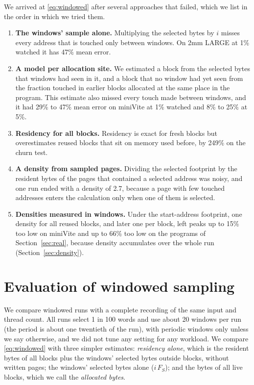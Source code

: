 \documentclass[11pt]{article}
\newcommand{\secref}[1]{Section~\ref{#1}}
\newcommand{\term}[1]{\emph{#1}}
\begin{document}
We arrived at \eqref{eq:windowed} after several approaches that failed, which we list in the order in which we tried them.
\begin{enumerate}
\item \textbf{The windows' sample alone.} Multiplying the selected bytes by $i$ misses every address that is touched only between windows. On 2mm LARGE at 1\% watched it has 47\% mean error.
\item \textbf{A model per allocation site.} We estimated a block from the selected bytes that windows had seen in it, and a block that no window had yet seen from the fraction touched in earlier blocks allocated at the same place in the program. This estimate also missed every touch made between windows, and it had 29\% to 47\% mean error on miniVite at 1\% watched and 8\% to 25\% at 5\%.
\item \textbf{Residency for all blocks.} Residency is exact for fresh blocks but overestimates reused blocks that sit on memory used before, by 249\% on the churn test.
\item \textbf{A density from sampled pages.} Dividing the selected footprint by the resident bytes of the pages that contained a selected address was noisy, and one run ended with a density of 2.7, because a page with few touched addresses enters the calculation only when one of them is selected.
\item \textbf{Densities measured in windows.} Under the start-address footprint, one density for all reused blocks, and later one per block, left peaks up to 15\% too low on miniVite and up to 66\% too low on the programs of \secref{sec:real}, because density accumulates over the whole run (\secref{sec:density}).
\end{enumerate}

\section{Evaluation of windowed sampling}
\label{sec:windowed-eval}

We compare windowed runs with a complete recording of the same input and thread count. All runs select 1 in 100 words and use about 20 windows per run (the period is about one twentieth of the run), with periodic windows only unless we say otherwise, and we did not tune any setting for any workload. We compare \eqref{eq:windowed} with three simpler estimates: \term{residency alone}, which is the resident bytes of all blocks plus the windows' selected bytes outside blocks, without written pages; the windows' selected bytes alone ($i\,F_S$); and the bytes of all live blocks, which we call the \term{allocated bytes}.
\end{document}
